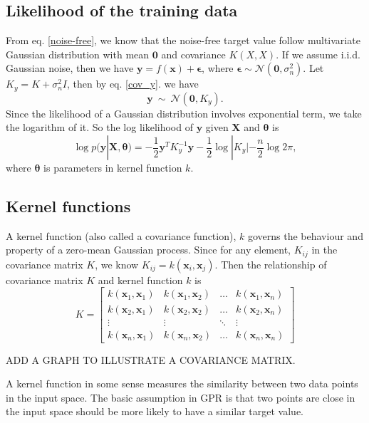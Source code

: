 \documentclass[12pt,a4paper]{article}
\theoremstyle{definition}
\numberwithin{equation}{section}
\let\vec\mathbf
\begin{document}
\subsection{Likelihood of the training data}
From eq. \ref{noise-free}, we know that the noise-free target value follow multivariate Gaussian distribution with mean $\vec 0$ and covariance $K(X,X)$. If we assume i.i.d. Gaussian noise, then we have $\vec y = f(\vec x) + \vec\epsilon$, where $\vec\epsilon \sim \mathcal{N}(\vec 0, \sigma^2_n)$. Let $K_y = K + \sigma^2_nI$, then by eq. \ref{cov_y}. we have
\begin{equation}
\vec y \  \sim \ \mathcal N \left(\vec 0,K_y  \right).
\end{equation}
Since the likelihood of a Gaussian distribution involves exponential term, we take the logarithm of it. So the log likelihood of $\vec y$ given $\vec X$ and $\vec \theta$ is
\begin{equation}\label{log-likelihood}
\log p(\vec y|\vec X, \vec \theta)=-\frac{1}{2}\vec y^T K_y^{-1}\vec y-\frac{1}{2}\log|K_y| - \frac{n}{2}\log 2\pi,
\end{equation}
where $\vec \theta$ is parameters in kernel function $k$.

\subsection{Kernel functions}
A kernel function (also called a covariance function), $k$ governs the behaviour and property of a zero-mean Gaussian process. Since for any element, $K_{ij}$ in the covariance matrix $K$, we know $K_{ij} = k(\vec x_i,\vec x_j)$. Then the relationship of covariance matrix $K$ and kernel function $k$ is
\begin{equation}\label{cov_mat}
K = 
\begin{bmatrix}
k(\vec x_1,\vec x_1) & k(\vec x_1,\vec x_2)& \dots& k(\vec x_1,\vec x_n)\\
k(\vec x_2,\vec x_1) & k(\vec x_2,\vec x_2)& \dots& k(\vec x_2,\vec x_n)\\
\vdots & \vdots  & \ddots & \vdots \\
k(\vec x_n,\vec x_1) & k(\vec x_n,\vec x_2)& \dots& k(\vec x_n,\vec x_n)
\end{bmatrix}
\end{equation}

ADD A GRAPH TO ILLUSTRATE A COVARIANCE MATRIX.

A kernel function in some sense measures the similarity between two data points in the input space. The basic assumption in GPR is that two points are close in the input space should be more likely to have a similar target value. 
\end{document}
